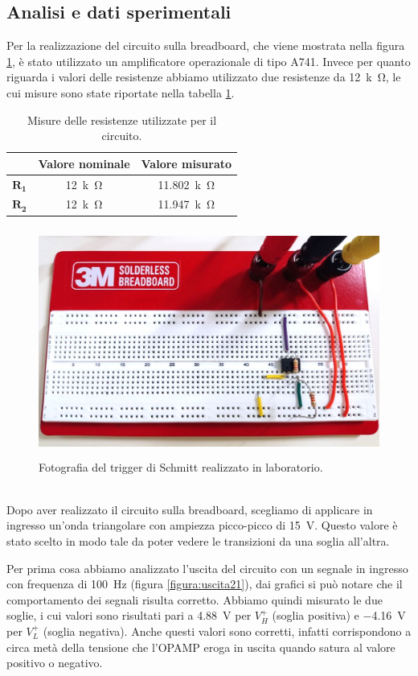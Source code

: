 \documentclass{report}
\begin{document}
\subsection{Analisi e dati sperimentali}
Per la realizzazione del circuito sulla breadboard, che viene mostrata nella figura \ref{figura:circuito2}, è stato utilizzato un amplificatore operazionale di tipo \textmu A741. Invece per quanto riguarda i valori delle resistenze abbiamo utilizzato due resistenze da \SI{12}{k\ohm}, le cui misure sono state riportate nella tabella \ref{table:mis_res2}.
\begin{table}[h!]
	\centering
	\begin{tabular}{|c|c|c|}
		\cline{2-3} 
		\multicolumn{1}{c|}{} & \textbf{Valore nominale} & \textbf{Valore misurato}\\ 
		\hline
		$\mathbf{R_1}$ & \SI{12}{k\ohm} & \SI{11.802}{k\ohm} \\ 
		\hline
		$\mathbf{R_2}$ & \SI{12}{k\ohm} & \SI{11.947}{k\ohm} \\ 
		\hline
	\end{tabular}
	\caption{Misure delle resistenze utilizzate per il circuito.}
	\label{table:mis_res2}
\end{table}
\begin{figure}[h]
	\centering
	\includegraphics[height=7.5cm]{immagini/circuito2}
	\caption{Fotografia del trigger di Schmitt realizzato in laboratorio.}
	\label{figura:circuito2}
\end{figure}
\\Dopo aver realizzato il circuito sulla breadboard, scegliamo di applicare in ingresso un'onda triangolare con ampiezza picco-picco di \SI{15}{\volt}. Questo valore è stato scelto in modo tale da poter vedere le transizioni da una soglia all'altra.\par
Per prima cosa abbiamo analizzato l'uscita del circuito con un segnale in ingresso con frequenza di \SI{100}{\hertz} (figura \ref{figura:uscita21}), dai grafici si può notare che il comportamento dei segnali risulta corretto. Abbiamo quindi misurato le due soglie, i cui valori sono risultati pari a \SI{4.88}{\volt} per ${V_H^+}$ (soglia positiva) e \SI{-4.16}{\volt} per ${V_L^+}$ (soglia negativa). Anche questi valori sono corretti, infatti corrispondono a circa metà della tensione che l'OPAMP eroga in uscita quando satura al valore positivo o negativo.
\end{document}
